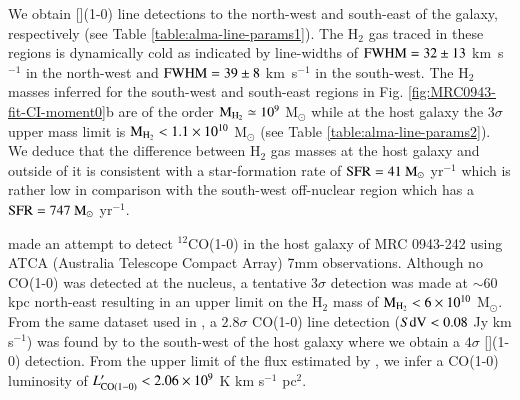 We obtain [](1-0) line detections to the north-west and south-east of the galaxy, respectively (see Table \ref{table:alma-line-params1}). The H$_2$ gas traced in these regions is dynamically cold as indicated by line-widths of $\rm FWHM=32 \pm 13$ km~s$^{-1}$ in the north-west and $\rm FWHM=39 \pm 8$ km~s$^{-1}$ in the south-west. The H$_2$ masses inferred for the south-west and south-east regions in Fig. \ref{fig:MRC0943-fit-CI-moment0}b are of the order $\rm M_{H_2} \simeq 10^{9}$ M$_\odot$ while at the host galaxy the $3\sigma$ upper mass limit is $\rm M_{H_2} < 1.1\times 10^{10}$ M$_\odot$ (see Table \ref{table:alma-line-params2}). We deduce that the difference between H$_2$ gas masses at the host galaxy and outside of it is consistent with a star-formation rate of $\rm SFR=41~M_\odot$ yr$^{-1}$ which is rather low in comparison with the south-west off-nuclear region which has a $\rm SFR = 747~M_\odot$ yr$^{-1}.$ 

\citet{Emonts2011} made an attempt to detect $^{12}$CO(1-0) in the host galaxy of MRC 0943-242 using ATCA (Australia Telescope Compact Array) 7mm observations. Although no CO(1-0) was detected at the nucleus, a tentative $3\sigma$ detection was made at $\sim$60 kpc north-east resulting in an upper limit on the H$_2$ mass of $\rm M_{H_2} < 6\times 10^{10}$ M$_\odot.$ From the same dataset used in \citet{Emonts2011}, a $2.8\sigma$ CO(1-0) line detection ($S{\rm dV} < 0.08$ Jy km s$^{-1}$) was found by \citet{Gullberg2016a} to the south-west of the host galaxy where we obtain a $4\sigma$ [](1-0) detection. From the upper limit of the flux estimated by \citet{Gullberg2016a}, we infer a CO(1-0) luminosity of $L'_{\rm CO(1-0)} < 2.06\times 10^{9}$ K km s$^{-1}$ pc$^2.$

